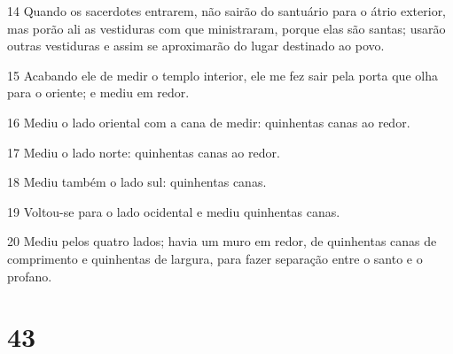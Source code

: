 \par 14 Quando os sacerdotes entrarem, não sairão do santuário para o átrio exterior, mas porão ali as vestiduras com que ministraram, porque elas são santas; usarão outras vestiduras e assim se aproximarão do lugar destinado ao povo.
\par 15 Acabando ele de medir o templo interior, ele me fez sair pela porta que olha para o oriente; e mediu em redor.
\par 16 Mediu o lado oriental com a cana de medir: quinhentas canas ao redor.
\par 17 Mediu o lado norte: quinhentas canas ao redor.
\par 18 Mediu também o lado sul: quinhentas canas.
\par 19 Voltou-se para o lado ocidental e mediu quinhentas canas.
\par 20 Mediu pelos quatro lados; havia um muro em redor, de quinhentas canas de comprimento e quinhentas de largura, para fazer separação entre o santo e o profano.

\chapter{43}

